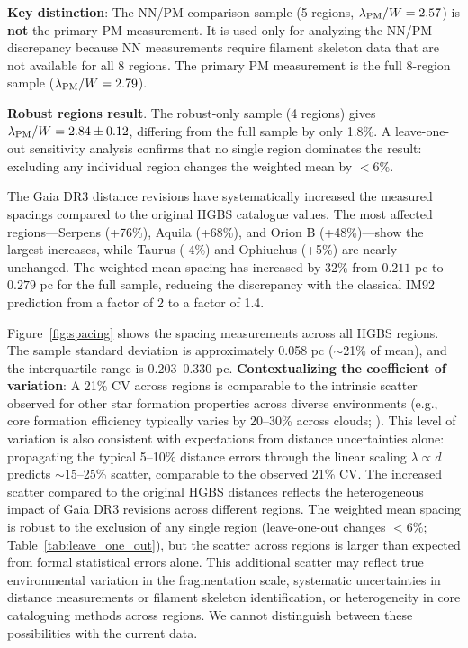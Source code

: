 \documentclass[twoside,twocolumn]{mnras}
\begin{document}
\textbf{Key distinction}: The NN/PM comparison sample (5 regions, $\lambda_{\rm PM}/W = 2.57$) is \textbf{not} the primary PM measurement. It is used only for analyzing the NN/PM discrepancy because NN measurements require filament skeleton data that are not available for all 8 regions. The primary PM measurement is the full 8-region sample ($\lambda_{\rm PM}/W = 2.79$).

\textbf{Robust regions result}. The robust-only sample (4 regions) gives $\lambda_{\rm PM}/W = 2.84 \pm 0.12$, differing from the full sample by only 1.8\%. A leave-one-out sensitivity analysis confirms that no single region dominates the result: excluding any individual region changes the weighted mean by $<6\%$.

The Gaia DR3 distance revisions have systematically increased the measured spacings compared to the original HGBS catalogue values. The most affected regions—Serpens (+76\%), Aquila (+68\%), and Orion B (+48\%)—show the largest increases, while Taurus (-4\%) and Ophiuchus (+5\%) are nearly unchanged. The weighted mean spacing has increased by 32\% from $0.211$ pc to $0.279$ pc for the full sample, reducing the discrepancy with the classical IM92 prediction from a factor of 2 to a factor of 1.4.

Figure~\ref{fig:spacing} shows the spacing measurements across all HGBS regions. The sample standard deviation is approximately 0.058 pc ($\sim$21\% of mean), and the interquartile range is $0.203$--$0.330$ pc. \textbf{Contextualizing the coefficient of variation}: A 21\% CV across regions is comparable to the intrinsic scatter observed for other star formation properties across diverse environments (e.g., core formation efficiency typically varies by 20--30\% across clouds; \citet{Molinari2022}). This level of variation is also consistent with expectations from distance uncertainties alone: propagating the typical 5--10\% distance errors through the linear scaling $\lambda \propto d$ predicts $\sim$15--25\% scatter, comparable to the observed 21\% CV. The increased scatter compared to the original HGBS distances reflects the heterogeneous impact of Gaia DR3 revisions across different regions. The weighted mean spacing is robust to the exclusion of any single region (leave-one-out changes $<6\%$; Table~\ref{tab:leave_one_out}), but the scatter across regions is larger than expected from formal statistical errors alone. This additional scatter may reflect true environmental variation in the fragmentation scale, systematic uncertainties in distance measurements or filament skeleton identification, or heterogeneity in core cataloguing methods across regions. We cannot distinguish between these possibilities with the current data.
\end{document}
